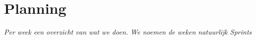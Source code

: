 \section{Planning}
\emph{Per week een overzicht van wat we doen. We noemen de weken natuurlijk \emph{Sprints}}